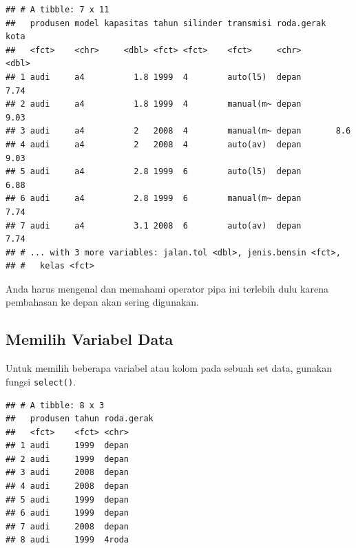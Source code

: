 \documentclass[openany]{book}
\newenvironment{Shaded}{\begin{snugshade}}{\end{snugshade}}
\newcommand{\KeywordTok}[1]{\textcolor[rgb]{0.13,0.29,0.53}{\textbf{#1}}}
\newcommand{\DecValTok}[1]{\textcolor[rgb]{0.00,0.00,0.81}{#1}}
\newcommand{\StringTok}[1]{\textcolor[rgb]{0.31,0.60,0.02}{#1}}
\newcommand{\CommentTok}[1]{\textcolor[rgb]{0.56,0.35,0.01}{\textit{#1}}}
\newcommand{\OperatorTok}[1]{\textcolor[rgb]{0.81,0.36,0.00}{\textbf{#1}}}
\newcommand{\NormalTok}[1]{#1}
\begin{document}
\begin{verbatim}
## # A tibble: 7 x 11
##   produsen model kapasitas tahun silinder transmisi roda.gerak  kota
##   <fct>    <chr>     <dbl> <fct> <fct>    <fct>     <chr>      <dbl>
## 1 audi     a4          1.8 1999  4        auto(l5)  depan       7.74
## 2 audi     a4          1.8 1999  4        manual(m~ depan       9.03
## 3 audi     a4          2   2008  4        manual(m~ depan       8.6 
## 4 audi     a4          2   2008  4        auto(av)  depan       9.03
## 5 audi     a4          2.8 1999  6        auto(l5)  depan       6.88
## 6 audi     a4          2.8 1999  6        manual(m~ depan       7.74
## 7 audi     a4          3.1 2008  6        auto(av)  depan       7.74
## # ... with 3 more variables: jalan.tol <dbl>, jenis.bensin <fct>,
## #   kelas <fct>
\end{verbatim}

Anda harus mengenal dan memahami operator pipa ini terlebih dulu karena
pembahasan ke depan akan sering digunakan.

\subsection{Memilih Variabel Data}\label{memilih-variabel-data}

Untuk memilih beberapa variabel atau kolom pada sebuah set data, gunakan
fungsi \texttt{select()}.

\begin{Shaded}
\end{Shaded}

\begin{Shaded}
\end{Shaded}

\begin{verbatim}
## # A tibble: 8 x 3
##   produsen tahun roda.gerak
##   <fct>    <fct> <chr>     
## 1 audi     1999  depan     
## 2 audi     1999  depan     
## 3 audi     2008  depan     
## 4 audi     2008  depan     
## 5 audi     1999  depan     
## 6 audi     1999  depan     
## 7 audi     2008  depan     
## 8 audi     1999  4roda
\end{verbatim}
\end{document}
